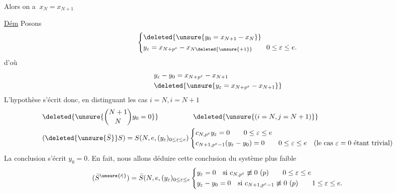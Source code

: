  Alors on a $\ x_N=x_{N+1}$

\uline{Dém} Posons
\[
\left\{\begin{aligned}
&\deleted{\unsure{y_0=x_{N+1}-x_N}}\\
&y_\varepsilon=x_{N+p^\varepsilon}-x_{N\deleted{\unsure{+1}}}\qquad 0\leq\varepsilon\leq e.
\end{aligned}\right.
\]
d'où
\[
\begin{aligned}
&y_\varepsilon-y_0=x_{N+p^\varepsilon}-x_{N+1}\\
&\deleted{\unsure{y_\varepsilon=x_{N+p^\varepsilon}-x_{N+1}}}
\end{aligned}
\]
L'hypothèse s'écrit donc, en distinguant les cas $i=N,i=N+1$
\[
\begin{aligned}
&\deleted{\unsure{\binom{N+1}{N}y_0=0}}\hspace{5em}\deleted{\unsure{(i=N,j=N+1)}}\\
&(\deleted{\unsure{\bar S}}S)=S(N,e,(y_\varepsilon)_{0\leq\varepsilon\leq e})\left\{\begin{aligned}
&c_{N,p^\varepsilon}y_\varepsilon=0\qquad 0\leq\varepsilon\leq e\\
&c_{N+1,p^\varepsilon-1}(y_\varepsilon-y_0)=0\qquad 0\leq\varepsilon\leq e\quad\text{(le cas $\varepsilon=0$ étant trivial)}
\end{aligned}\right.
\end{aligned}
\]
La conclusion s'écrit $y_0=0$. En fait, nous allons déduire cette conclusion du système plus faible 
\[
(\bar S^{\unsure{\prime|{}}})=\bar S(N,e,(y_\varepsilon)_{0\leq\varepsilon\leq e}\left\{\begin{aligned}
&y_\varepsilon=0\quad\text{si }c_{N,p^\varepsilon}\not\equiv0\ (p)\qquad 0\leq\varepsilon\leq e\\
&y_\varepsilon-y_0=0\quad\text{si }c_{N+1,p^\varepsilon-1}\not\equiv0\ (p)\qquad 1\leq\varepsilon\leq e.
\end{aligned}\right.
\]

